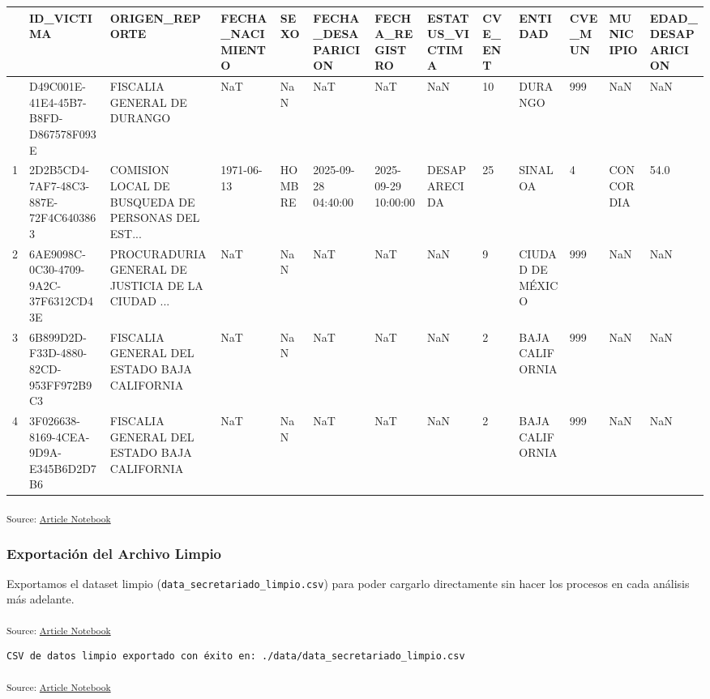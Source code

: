 \documentclass[
]{agujournal2019}
\newcounter{none} %
\begin{document}
{\def\LTcaptype{none} %
\begin{longtable}[]{@{}lllllllllllll@{}}
\toprule\noalign{}
& ID\_VICTIMA & ORIGEN\_REPORTE & FECHA\_NACIMIENTO & SEXO &
FECHA\_DESAPARICION & FECHA\_REGISTRO & ESTATUS\_VICTIMA & CVE\_ENT &
ENTIDAD & CVE\_MUN & MUNICIPIO & EDAD\_DESAPARICION \\
\midrule\noalign{}
\endhead
\bottomrule\noalign{}
\endlastfoot
0 & D49C001E-41E4-45B7-B8FD-D867578F093E & FISCALIA GENERAL DE DURANGO &
NaT & NaN & NaT & NaT & NaN & 10 & DURANGO & 999 & NaN & NaN \\
1 & 2D2B5CD4-7AF7-48C3-887E-72F4C6403863 & COMISION LOCAL DE BUSQUEDA DE
PERSONAS DEL EST... & 1971-06-13 & HOMBRE & 2025-09-28 04:40:00 &
2025-09-29 10:00:00 & DESAPARECIDA & 25 & SINALOA & 4 & CONCORDIA &
54.0 \\
2 & 6AE9098C-0C30-4709-9A2C-37F6312CD43E & PROCURADURIA GENERAL DE
JUSTICIA DE LA CIUDAD ... & NaT & NaN & NaT & NaT & NaN & 9 & CIUDAD DE
MÉXICO & 999 & NaN & NaN \\
3 & 6B899D2D-F33D-4880-82CD-953FF972B9C3 & FISCALIA GENERAL DEL ESTADO
BAJA CALIFORNIA & NaT & NaN & NaT & NaT & NaN & 2 & BAJA CALIFORNIA &
999 & NaN & NaN \\
4 & 3F026638-8169-4CEA-9D9A-E345B6D2D7B6 & FISCALIA GENERAL DEL ESTADO
BAJA CALIFORNIA & NaT & NaN & NaT & NaT & NaN & 2 & BAJA CALIFORNIA &
999 & NaN & NaN \\
\end{longtable}
}

\textsubscript{Source:
\href{https://Rou-uu.github.io/pruebaQuarto/index.qmd.html}{Article
Notebook}}

\subsubsection{Exportación del Archivo
Limpio}\label{exportaciuxf3n-del-archivo-limpio}

Exportamos el dataset limpio (\texttt{data\_secretariado\_limpio.csv})
para poder cargarlo directamente sin hacer los procesos en cada análisis
más adelante.

\textsubscript{Source:
\href{https://Rou-uu.github.io/pruebaQuarto/index.qmd.html}{Article
Notebook}}

\begin{verbatim}
CSV de datos limpio exportado con éxito en: ./data/data_secretariado_limpio.csv
\end{verbatim}

\textsubscript{Source:
\href{https://Rou-uu.github.io/pruebaQuarto/index.qmd.html}{Article
Notebook}}
\end{document}
